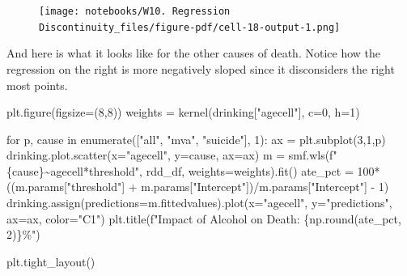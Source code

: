 \documentclass[
  letterpaper,
  DIV=11,
  numbers=noendperiod]{scrreprt}
\newenvironment{Shaded}{\begin{snugshade}}{\end{snugshade}}
\newcommand{\BuiltInTok}[1]{\textcolor[rgb]{0.00,0.23,0.31}{#1}}
\newcommand{\ControlFlowTok}[1]{\textcolor[rgb]{0.00,0.23,0.31}{#1}}
\newcommand{\DecValTok}[1]{\textcolor[rgb]{0.68,0.00,0.00}{#1}}
\newcommand{\KeywordTok}[1]{\textcolor[rgb]{0.00,0.23,0.31}{#1}}
\newcommand{\NormalTok}[1]{\textcolor[rgb]{0.00,0.23,0.31}{#1}}
\newcommand{\OperatorTok}[1]{\textcolor[rgb]{0.37,0.37,0.37}{#1}}
\newcommand{\SpecialCharTok}[1]{\textcolor[rgb]{0.37,0.37,0.37}{#1}}
\newcommand{\SpecialStringTok}[1]{\textcolor[rgb]{0.13,0.47,0.30}{#1}}
\newcommand{\StringTok}[1]{\textcolor[rgb]{0.13,0.47,0.30}{#1}}
\begin{document}
\begin{figure}[H]

{\centering \texttt{[image: notebooks/W10. Regression Discontinuity\_files/figure-pdf/cell-18-output-1.png]}

}

\end{figure}

And here is what it looks like for the other causes of death. Notice how
the regression on the right is more negatively sloped since it
disconsiders the right most points.

\begin{Shaded}
\begin{Highlighting}[]
\NormalTok{plt.figure(figsize}\OperatorTok{=}\NormalTok{(}\DecValTok{8}\NormalTok{,}\DecValTok{8}\NormalTok{))}
\NormalTok{weights }\OperatorTok{=}\NormalTok{ kernel(drinking[}\StringTok{"agecell"}\NormalTok{], c}\OperatorTok{=}\DecValTok{0}\NormalTok{, h}\OperatorTok{=}\DecValTok{1}\NormalTok{)}

\ControlFlowTok{for}\NormalTok{ p, cause }\KeywordTok{in} \BuiltInTok{enumerate}\NormalTok{([}\StringTok{"all"}\NormalTok{, }\StringTok{"mva"}\NormalTok{, }\StringTok{"suicide"}\NormalTok{], }\DecValTok{1}\NormalTok{):}
\NormalTok{    ax }\OperatorTok{=}\NormalTok{ plt.subplot(}\DecValTok{3}\NormalTok{,}\DecValTok{1}\NormalTok{,p)}
\NormalTok{    drinking.plot.scatter(x}\OperatorTok{=}\StringTok{"agecell"}\NormalTok{, y}\OperatorTok{=}\NormalTok{cause, ax}\OperatorTok{=}\NormalTok{ax)}
\NormalTok{    m }\OperatorTok{=}\NormalTok{ smf.wls(}\SpecialStringTok{f"}\SpecialCharTok{\{}\NormalTok{cause}\SpecialCharTok{\}}\SpecialStringTok{\textasciitilde{}agecell*threshold"}\NormalTok{, rdd\_df, weights}\OperatorTok{=}\NormalTok{weights).fit()}
\NormalTok{    ate\_pct }\OperatorTok{=} \DecValTok{100}\OperatorTok{*}\NormalTok{((m.params[}\StringTok{"threshold"}\NormalTok{] }\OperatorTok{+}\NormalTok{ m.params[}\StringTok{"Intercept"}\NormalTok{])}\OperatorTok{/}\NormalTok{m.params[}\StringTok{"Intercept"}\NormalTok{] }\OperatorTok{{-}} \DecValTok{1}\NormalTok{)}
\NormalTok{    drinking.assign(predictions}\OperatorTok{=}\NormalTok{m.fittedvalues).plot(x}\OperatorTok{=}\StringTok{"agecell"}\NormalTok{, y}\OperatorTok{=}\StringTok{"predictions"}\NormalTok{, ax}\OperatorTok{=}\NormalTok{ax, color}\OperatorTok{=}\StringTok{"C1"}\NormalTok{)}
\NormalTok{    plt.title(}\SpecialStringTok{f"Impact of Alcohol on Death: }\SpecialCharTok{\{}\NormalTok{np}\SpecialCharTok{.}\BuiltInTok{round}\NormalTok{(ate\_pct, }\DecValTok{2}\NormalTok{)}\SpecialCharTok{\}}\SpecialStringTok{\%"}\NormalTok{)}

\NormalTok{plt.tight\_layout()}
\end{Highlighting}
\end{Shaded}
\end{document}

